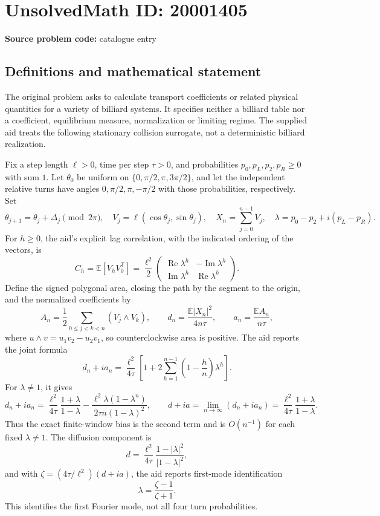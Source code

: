 \documentclass[11pt]{article}
\newcommand{\E}{\mathbb{E}}
\begin{document}
\section*{UnsolvedMath ID: 20001405}
\textbf{Source problem code:} catalogue entry
\subsection{Definitions and mathematical statement}
The original problem asks to calculate transport coefficients or related physical quantities for a variety of billiard systems. It specifies neither a billiard table nor a coefficient, equilibrium measure, normalization or limiting regime. The supplied aid treats the following stationary collision surrogate, not a deterministic billiard realization.

Fix a step length \(\ell>0\), time per step \(\tau>0\), and probabilities \(p_0,p_L,p_2,p_R\geq0\) with sum \(1\). Let \(\theta_0\) be uniform on \(\{0,\pi/2,\pi,3\pi/2\}\), and let the independent relative turns have angles \(0,\pi/2,\pi,-\pi/2\) with those probabilities, respectively. Set
\[
 \theta_{j+1}=\theta_j+\Delta_j\pmod{2\pi},\quad
 V_j=\ell(\cos\theta_j,\sin\theta_j),\quad
 X_n=\sum_{j=0}^{n-1}V_j,\quad
 \lambda=p_0-p_2+i(p_L-p_R).
\]
For \(h\geq0\), the aid's explicit lag correlation, with the indicated ordering of the vectors, is
\[
 C_h=\E[V_hV_0^{\mathsf T}]
 =\frac{\ell^2}{2}
 \begin{pmatrix}\operatorname{Re}\lambda^h&-\operatorname{Im}\lambda^h\\
 \operatorname{Im}\lambda^h&\operatorname{Re}\lambda^h\end{pmatrix}.
\]
Define the signed polygonal area, closing the path by the segment to the origin, and the normalized coefficients by
\[
 A_n=\frac12\sum_{0\leq j<k<n}(V_j\wedge V_k),\qquad
 d_n=\frac{\E|X_n|^2}{4n\tau},\qquad
 a_n=\frac{\E A_n}{n\tau},
\]
where \(u\wedge v=u_1v_2-u_2v_1\), so counterclockwise area is positive. The aid reports the joint formula
\[
 d_n+ia_n=\frac{\ell^2}{4\tau}
 \left[1+2\sum_{h=1}^{n-1}\left(1-\frac hn\right)\lambda^h\right].
\]
For \(\lambda\ne1\), it gives
\[
 d_n+ia_n
 =\frac{\ell^2}{4\tau}\frac{1+\lambda}{1-\lambda}
 -\frac{\ell^2\lambda(1-\lambda^n)}{2\tau n(1-\lambda)^2},
 \qquad
 d+ia=\lim_{n\to\infty}(d_n+ia_n)
 =\frac{\ell^2}{4\tau}\frac{1+\lambda}{1-\lambda}.
\]
Thus the exact finite-window bias is the second term and is \(O(n^{-1})\) for each fixed \(\lambda\ne1\). The diffusion component is
\[
 d=\frac{\ell^2}{4\tau}\frac{1-|\lambda|^2}{|1-\lambda|^2},
\]
and with \(\zeta=(4\tau/\ell^2)(d+ia)\), the aid reports first-mode identification
\[
 \lambda=\frac{\zeta-1}{\zeta+1}.
\]
This identifies the first Fourier mode, not all four turn probabilities.
\end{document}
